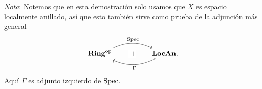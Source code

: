 \begin{sol}
\medskip
\noindent\emph{Nota}: Notemos que en esta demostración solo usamos que $X$ es espacio localmente anillado, así que esto también sirve como prueba de la adjunción más general
\[
\begin{tikzcd}[column sep=huge]
\Ring^{\mathrm{op}}\arrow[r,bend left=25,"\Spec"]\arrow[r,phantom,"\dashv" description]
&\LocAn\arrow[l,bend left=25,"\Gamma"].
\end{tikzcd}
\]
Aquí $\Gamma$ es adjunto izquierdo de $\operatorname{Spec}$.
\end{sol}

